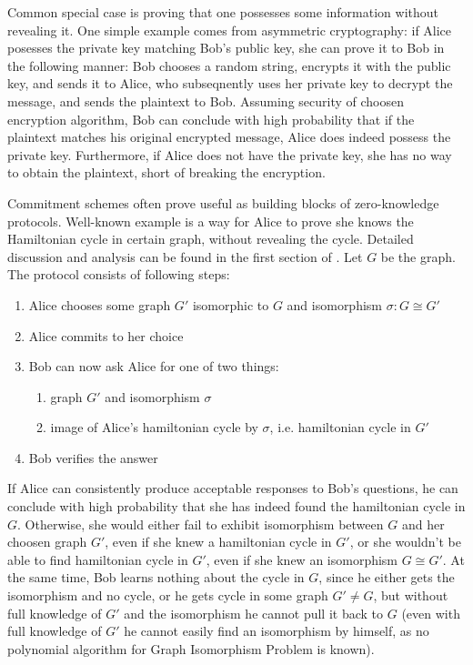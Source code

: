 \documentclass[10pt]{article}
\begin{document}
Common special case is proving that one possesses some information without revealing it.
One simple example comes from asymmetric cryptography: if Alice posesses the private key matching Bob's
public key, she can prove it to Bob in the following manner: Bob chooses a random string, encrypts it
with the public key, and sends it to Alice, who subseqnently uses her private key to decrypt the message,
and sends the plaintext to Bob. Assuming security of choosen encryption algorithm, Bob can conclude 
with high probability that if the plaintext matches his original encrypted message, Alice does indeed
possess the private key. Furthermore, if Alice does not have the private key, she has no way to obtain
the plaintext, short of breaking the encryption.

Commitment schemes often prove useful as building blocks of zero-knowledge protocols. Well-known example
is a way for Alice to prove she knows the Hamiltonian cycle in certain graph, without revealing the
cycle. Detailed discussion and analysis can be found in the first section of \cite{CM:CryptoNotes}. 
Let \(G\) be the graph. The protocol consists of following steps:

\begin{enumerate}
  \item Alice chooses some graph \(G'\) isomorphic to \(G\) and isomorphism \(\sigma\colon G\cong G'\)
  \item Alice commits to her choice
  \item Bob can now ask Alice for one of two things:
    \begin{enumerate}
      \item graph \(G'\) and isomorphism \(\sigma\)
      \item image of Alice's hamiltonian cycle by \(\sigma\), i.e. hamiltonian cycle in \(G'\)
    \end{enumerate}
  \item Bob verifies the answer
\end{enumerate}

If Alice can consistently produce acceptable responses to Bob's questions, he can conclude with high
probability that she has indeed found the hamiltonian cycle in \(G\). Otherwise, she would either fail
to exhibit isomorphism between \(G\) and her choosen graph \(G'\), even if she knew a hamiltonian
cycle in \(G'\), or she wouldn't be able to find hamiltonian cycle in \(G'\), even if she knew an
isomorphism \(G\cong G'\). At the same time, Bob learns nothing about the cycle in \(G\), since he
either gets the isomorphism and no cycle, or he gets cycle in some graph \(G'\neq G\), but without
full knowledge of \(G'\) and the isomorphism he cannot pull it back to \(G\) (even with full knowledge
of \(G'\) he cannot easily find an isomorphism by himself, as no polynomial algorithm for Graph 
Isomorphism Problem is known).
\end{document}
